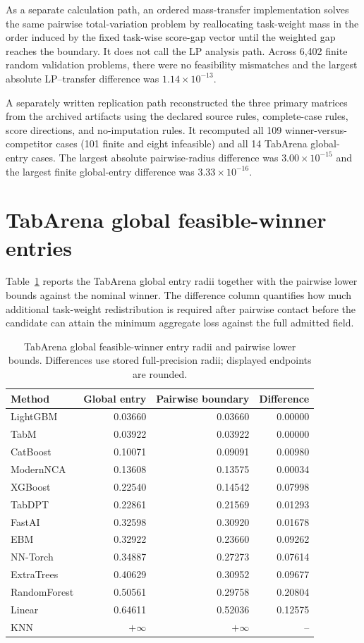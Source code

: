 \documentclass[11pt]{article}
\begin{document}
As a separate calculation path, an ordered mass-transfer implementation solves the same pairwise total-variation problem by reallocating task-weight mass in the order induced by the fixed task-wise score-gap vector until the weighted gap reaches the boundary. It does not call the LP analysis path. Across 6,402 finite random validation problems, there were no feasibility mismatches and the largest absolute LP--transfer difference was $1.14\times10^{-13}$.

A separately written replication path reconstructed the three primary matrices from the archived artifacts using the declared source rules, complete-case rules, score directions, and no-imputation rules. It recomputed all 109 winner-versus-competitor cases (101 finite and eight infeasible) and all 14 TabArena global-entry cases. The largest absolute pairwise-radius difference was $3.00\times10^{-15}$ and the largest finite global-entry difference was $3.33\times10^{-16}$.

\section{TabArena global feasible-winner entries}
Table~\ref{tab:global} reports the TabArena global entry radii together with the pairwise lower bounds against the nominal winner. The difference column quantifies how much additional task-weight redistribution is required after pairwise contact before the candidate can attain the minimum aggregate loss against the full admitted field.

\begin{table}[htbp]
\centering
\caption{TabArena global feasible-winner entry radii and pairwise lower bounds. Differences use stored full-precision radii; displayed endpoints are rounded.}
\label{tab:global}
\small
\begin{tabular}{lrrr}
\toprule
Method & Global entry & Pairwise boundary & Difference\\
\midrule
LightGBM & 0.03660 & 0.03660 & 0.00000\\
TabM & 0.03922 & 0.03922 & 0.00000\\
CatBoost & 0.10071 & 0.09091 & 0.00980\\
ModernNCA & 0.13608 & 0.13575 & 0.00034\\
XGBoost & 0.22540 & 0.14542 & 0.07998\\
TabDPT & 0.22861 & 0.21569 & 0.01293\\
FastAI & 0.32598 & 0.30920 & 0.01678\\
EBM & 0.32922 & 0.23660 & 0.09262\\
NN-Torch & 0.34887 & 0.27273 & 0.07614\\
ExtraTrees & 0.40629 & 0.30952 & 0.09677\\
RandomForest & 0.50561 & 0.29758 & 0.20804\\
Linear & 0.64611 & 0.52036 & 0.12575\\
KNN & $+\infty$ & $+\infty$ & --\\
\bottomrule
\end{tabular}
\end{table}
\end{document}
